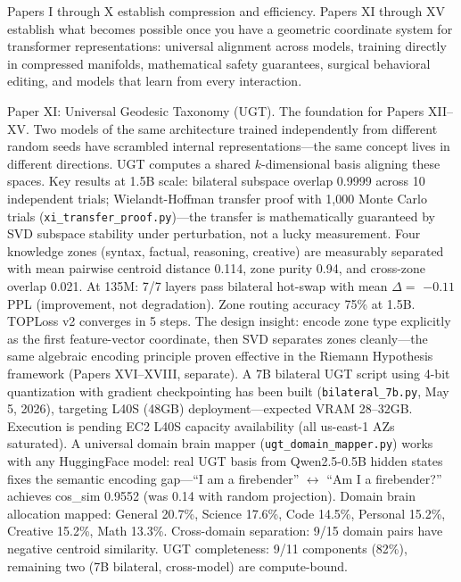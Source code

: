 \documentclass[11pt]{article}
\begin{document}
Papers I through X establish compression and efficiency. Papers XI through XV establish what becomes possible once you have a geometric coordinate system for transformer representations: universal alignment across models, training directly in compressed manifolds, mathematical safety guarantees, surgical behavioral editing, and models that learn from every interaction.

Paper XI: Universal Geodesic Taxonomy (UGT). The foundation for Papers XII--XV. Two models of the same architecture trained independently from different random seeds have scrambled internal representations---the same concept lives in different directions. UGT computes a shared $k$-dimensional basis aligning these spaces. Key results at 1.5B scale: bilateral subspace overlap 0.9999 across 10 independent trials; Wielandt-Hoffman transfer proof with 1,000 Monte Carlo trials (\texttt{xi\_transfer\_proof.py})---the transfer is mathematically guaranteed by SVD subspace stability under perturbation, not a lucky measurement. Four knowledge zones (syntax, factual, reasoning, creative) are measurably separated with mean pairwise centroid distance 0.114, zone purity 0.94, and cross-zone overlap 0.021. At 135M: 7/7 layers pass bilateral hot-swap with mean $\Delta =$ $-0.11$ PPL (improvement, not degradation). Zone routing accuracy 75\% at 1.5B. TOPLoss v2 converges in 5 steps. The design insight: encode zone type explicitly as the first feature-vector coordinate, then SVD separates zones cleanly---the same algebraic encoding principle proven effective in the Riemann Hypothesis framework (Papers XVI--XVIII, separate). A 7B bilateral UGT script using 4-bit quantization with gradient checkpointing has been built (\texttt{bilateral\_7b.py}, May 5, 2026), targeting L40S (48GB) deployment---expected VRAM 28--32GB. Execution is pending EC2 L40S capacity availability (all us-east-1 AZs saturated). A universal domain brain mapper (\texttt{ugt\_domain\_mapper.py}) works with any HuggingFace model: real UGT basis from Qwen2.5-0.5B hidden states fixes the semantic encoding gap---``I am a firebender'' $\leftrightarrow$ ``Am I a firebender?'' achieves cos\_sim 0.9552 (was 0.14 with random projection). Domain brain allocation mapped: General 20.7\%, Science 17.6\%, Code 14.5\%, Personal 15.2\%, Creative 15.2\%, Math 13.3\%. Cross-domain separation: 9/15 domain pairs have negative centroid similarity. UGT completeness: 9/11 components (82\%), remaining two (7B bilateral, cross-model) are compute-bound.
\end{document}
